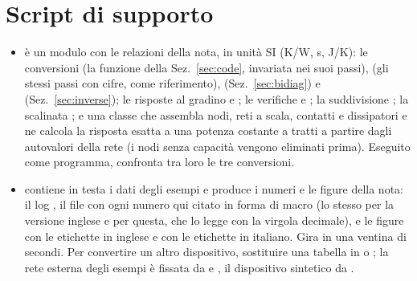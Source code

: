 \documentclass[10pt,a4paper]{scrartcl}
\let\newcommand\fcitdefine
\newcommand{\code}[1]{\texttt{#1}}
\begin{document}
\appendix
\section{Script di supporto}
\label{sec:scripts}
\begin{itemize}
\item {} è un modulo con le relazioni della nota, in unità SI (K/W, s, J/K): le conversioni  (la funzione della Sez.~\ref{sec:code}, invariata nei suoi passi),  (gli stessi passi con \fcmpDigits{} cifre, come riferimento),  (Sez.~\ref{sec:bidiag}) e  (Sez.~\ref{sec:inverse}); le risposte al gradino  e ; le verifiche  e ; la suddivisione ; la scalinata ; e una classe  che assembla nodi, reti a scala, contatti e dissipatori e ne calcola la risposta esatta a una potenza costante a tratti a partire dagli autovalori della rete (i nodi senza capacità vengono eliminati prima). Eseguito come programma, confronta tra loro le tre conversioni.
\item {} contiene in testa i dati degli esempi e produce i numeri e le figure della nota: il log , il file  con ogni numero qui citato in forma di macro (lo stesso per la versione inglese e per questa, che lo legge con la virgola decimale), e le figure  con le etichette in inglese e  con le etichette in italiano. Gira in una ventina di secondi. Per convertire un altro dispositivo, sostituire una tabella in  o ; la rete esterna degli esempi è fissata da  e , il dispositivo sintetico da .
\end{itemize}
\end{document}

